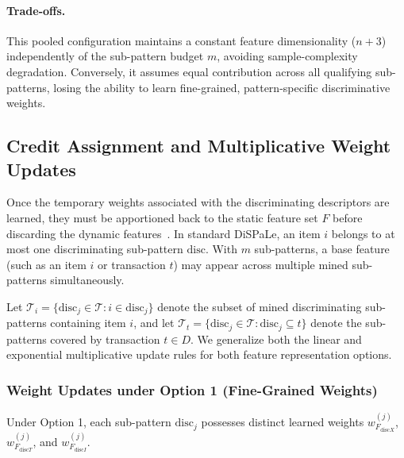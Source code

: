 \documentclass[sigconf]{acmart}
\newcommand{\disc}{\mathrm{disc}}
\begin{document}
\paragraph{Trade-offs.}
This pooled configuration maintains a constant feature dimensionality ($n+3$) independently of the sub-pattern budget $m$, avoiding sample-complexity degradation. Conversely, it assumes equal contribution across all qualifying sub-patterns, losing the ability to learn fine-grained, pattern-specific discriminative weights.

\subsection{Credit Assignment and Multiplicative Weight Updates}
Once the temporary weights associated with the discriminating descriptors are learned, they must be apportioned back to the static feature set $F$ before discarding the dynamic features~\cite{hien2023}. In standard DiSPaLe, an item $i$ belongs to at most one discriminating sub-pattern $\disc$. With $m$ sub-patterns, a base feature (such as an item $i$ or transaction $t$) may appear across multiple mined sub-patterns simultaneously.

Let $\mathcal T_i=\{\disc_j\in\mathcal T:i\in\disc_j\}$ denote the subset of mined discriminating sub-patterns containing item $i$, and let $\mathcal T_t=\{\disc_j\in\mathcal T:\disc_j\subseteq t\}$ denote the sub-patterns covered by transaction $t\in D$. We generalize both the linear and exponential multiplicative update rules for both feature representation options.

\subsubsection{Weight Updates under Option 1 (Fine-Grained Weights)}
Under Option 1, each sub-pattern $\disc_j$ possesses distinct learned weights $w_{F_{\disc X}}^{(j)}$, $w_{F_{\disc T}}^{(j)}$, and $w_{F_{\disc I}}^{(j)}$.
\end{document}
